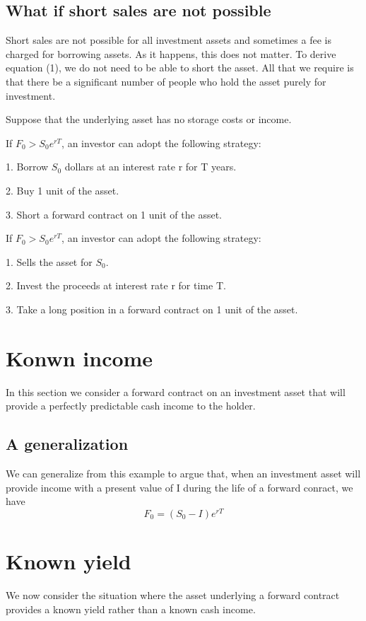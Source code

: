\documentclass{article}
\begin{document}
\subsection{What if short sales are not possible}
Short sales are not possible for all investment assets and sometimes a fee is charged for borrowing assets. As it happens, this does not matter. To derive equation (1), we do not need to be able to short the asset. All that we require is that there be a significant number of people who hold the asset purely for investment.

Suppose that the underlying asset has no storage costs or income.

If $ F_0>S_0e^{rT} $, an investor can adopt the following strategy:

1. Borrow $ S_0 $ dollars at an interest rate r for T years.

2. Buy 1 unit of the asset.

3. Short a forward contract on 1 unit of the asset.
\\ \hspace*{\fill}

If $ F_0>S_0e^{rT} $, an investor can adopt the following strategy:

1. Sells the asset for $ S_0 $.

2. Invest the proceeds at interest rate r for time T.

3. Take a long position in a forward contract on 1 unit of the asset.

\section{Konwn income}
In this section we consider a forward contract on an investment asset that will provide a perfectly predictable cash income to the holder.

\subsection{A generalization}
We can generalize from this example to argue that, when an investment asset will provide income with a present value of I during the life of a forward conract, we have
\begin{equation}
	F_0=(S_0-I)e^{rT}
\end{equation}

\section{Known yield}
We now consider the situation where the asset underlying a forward contract  provides a known yield rather than a known cash income.
\end{document}
